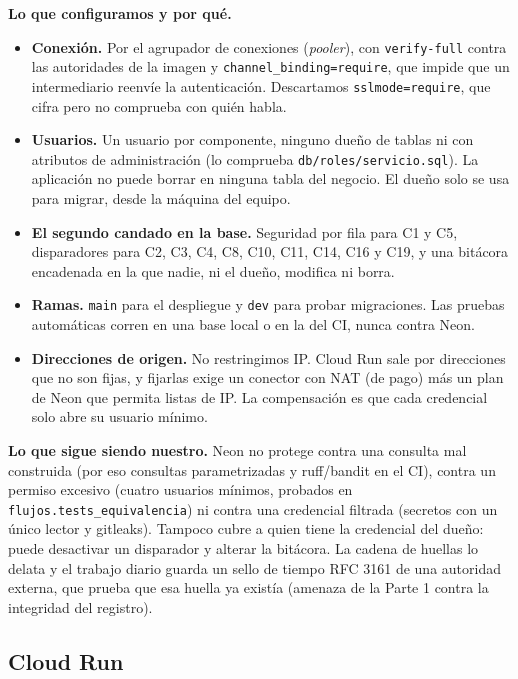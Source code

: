 \documentclass[11pt,letterpaper]{article}
\newcommand{\cod}[1]{\texttt{\small #1}}
\newcommand{\arch}[1]{\texttt{\small #1}}
\begin{document}
\textbf{Lo que configuramos y por qué.}
\begin{itemize}
  \item \textbf{Conexión.} Por el agrupador de conexiones (\emph{pooler}), con \cod{verify-full} contra las autoridades de la imagen y \cod{channel\_binding=require}, que impide que un intermediario reenvíe la autenticación. Descartamos \cod{sslmode=require}, que cifra pero no comprueba con quién habla.
  \item \textbf{Usuarios.} Un usuario por componente, ninguno dueño de tablas ni con atributos de administración (lo comprueba \arch{db/roles/servicio.sql}). La aplicación no puede borrar en ninguna tabla del negocio. El dueño solo se usa para migrar, desde la máquina del equipo.
  \item \textbf{El segundo candado en la base.} Seguridad por fila para C1 y C5, disparadores para C2, C3, C4, C8, C10, C11, C14, C16 y C19, y una bitácora encadenada en la que nadie, ni el dueño, modifica ni borra.
  \item \textbf{Ramas.} \cod{main} para el despliegue y \cod{dev} para probar migraciones. Las pruebas automáticas corren en una base local o en la del CI, nunca contra Neon.
  \item \textbf{Direcciones de origen.} No restringimos IP. Cloud Run sale por direcciones que no son fijas, y fijarlas exige un conector con NAT (de pago) más un plan de Neon que permita listas de IP. La compensación es que cada credencial solo abre su usuario mínimo.
\end{itemize}

\textbf{Lo que sigue siendo nuestro.} Neon no protege contra una consulta mal construida (por eso consultas parametrizadas y ruff/bandit en el CI), contra un permiso excesivo (cuatro usuarios mínimos, probados en \cod{flujos.tests\_equivalencia}) ni contra una credencial filtrada (secretos con un único lector y gitleaks). Tampoco cubre a quien tiene la credencial del dueño: puede desactivar un disparador y alterar la bitácora. La cadena de huellas lo delata y el trabajo diario guarda un sello de tiempo RFC 3161 de una autoridad externa, que prueba que esa huella ya existía (amenaza de la Parte 1 contra la integridad del registro).

\subsection{Cloud Run}
\end{document}
